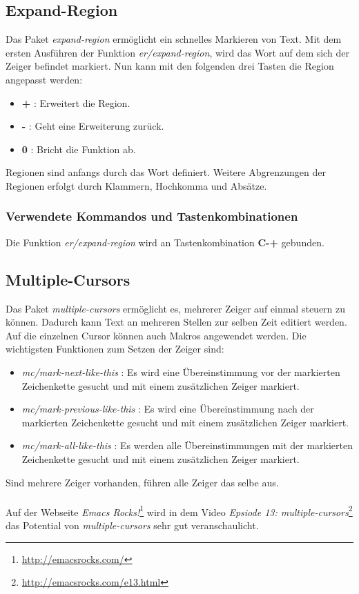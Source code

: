 \subsection{Expand-Region}
\label{subsec:expandregion}
Das Paket \textit{expand-region} ermöglicht ein schnelles Markieren
von Text. Mit dem ersten Ausführen der Funktion
\textit{er/expand-region}, wird das Wort auf dem sich der Zeiger
befindet markiert. Nun kann mit den folgenden drei Tasten die Region
angepasst werden:
\begin{itemize}
\item \textbf{+} : Erweitert die Region.
\item \textbf{-} : Geht eine Erweiterung zurück.
\item \textbf{0} : Bricht die Funktion ab.
\end{itemize}
Regionen sind anfangs durch das Wort definiert. Weitere Abgrenzungen
der Regionen erfolgt durch Klammern, Hochkomma und
Absätze. \cite{ExpandRegion}\\

\subsubsection{Verwendete Kommandos und Tastenkombinationen}
Die Funktion \textit{er/expand-region} wird an Tastenkombination
\textbf{C-+} gebunden.

\subsection{Multiple-Cursors}
\label{subsec:multiplecursors}
Das Paket \textit{multiple-cursors} ermöglicht es, mehrerer Zeiger auf
einmal steuern zu können. Dadurch kann Text an mehreren Stellen zur
selben Zeit editiert werden. Auf die einzelnen Cursor können auch
Makros angewendet werden. Die wichtigsten Funktionen zum Setzen der
Zeiger sind:
\begin{itemize}
\item \textit{mc/mark-next-like-this} : Es wird eine Übereinstimmung
  vor der markierten Zeichenkette gesucht und mit einem zusätzlichen
  Zeiger markiert.
\item \textit{mc/mark-previous-like-this} : Es wird eine
  Übereinstimmung nach der markierten Zeichenkette gesucht und mit
  einem zusätzlichen Zeiger markiert.
\item \textit{mc/mark-all-like-this} : Es werden alle
  Übereinstimmungen mit der markierten Zeichenkette gesucht und mit
  einem zusätzlichen Zeiger markiert.
\end{itemize}
Sind mehrere Zeiger vorhanden, führen alle Zeiger das selbe
aus. \cite{MultipleCursors}\\\\ Auf der Webseite \textit{Emacs
  Rocks!}\footnote{\url{http://emacsrocks.com/}} wird in dem Video
\textit{Epsiode 13:
  multiple-cursors}\footnote{\url{http://emacsrocks.com/e13.html}} das
Potential von \textit{multiple-cursors} sehr gut veranschaulicht.\\

